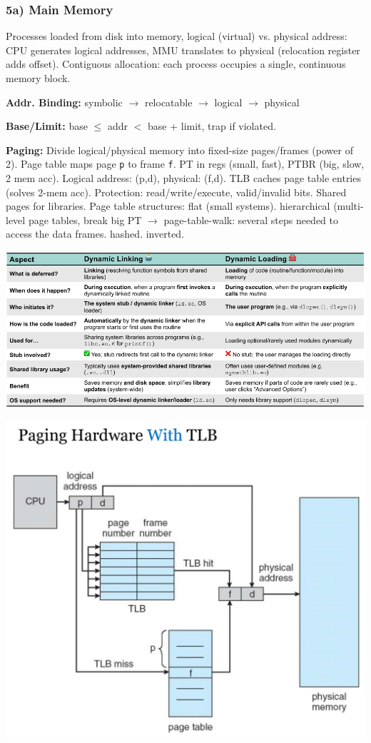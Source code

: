 \subsubsection*{5a) Main Memory}
Processes loaded from disk into memory, logical (virtual) vs. physical address: CPU generates logical addresses, MMU translates to physical (relocation register adds offset). Contiguous allocation: each process occupies a single, continuous memory block.

\textbf{Addr. Binding:} symbolic $\to$ relocatable $\to$ logical $\to$ physical

\textbf{Base/Limit:} base $\leq$ addr $<$ base + limit, trap if violated.

\textbf{Paging:} Divide logical/physical memory into fixed-size pages/frames (power of 2).
Page table maps page \texttt{p} to frame \texttt{f}.
PT in regs (small, fast), PTBR (big, slow, 2 mem acc).
Logical address: (p,d), physical: (f,d).
TLB caches page table entries (solves 2-mem acc).
Protection: read/write/execute, valid/invalid bits.
Shared pages for libraries.
Page table structures: flat (small systems).
hierarchical (multi-level page tables, break big PT $\to$ page-table-walk: several steps needed to access the data frames.
hashed. inverted.

\includegraphics[width=1\linewidth]{images/05a_p21_dyn_link_dyn_load.png}

\includegraphics[width=0.95\linewidth]{images/05a_p45_tlb.png}

